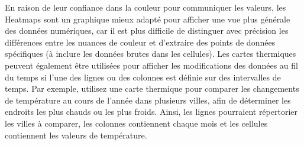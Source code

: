 \documentclass[french, a4paper, 12pt]{report}
\begin{document}
En raison de leur confiance dans la couleur pour communiquer les valeurs, les Heatmaps sont un graphique mieux adapté pour afficher une vue plus générale des données numériques, car il est plus difficile de distinguer avec précision les différences entre les nuances de couleur et d’extraire des points de données spécifiques (à inclure les données brutes dans les cellules).
Les cartes thermiques peuvent également être utilisées pour afficher les modifications des données au fil du temps si l'une des lignes ou des colonnes est définie sur des intervalles de temps. Par exemple, utilisez une carte thermique pour comparer les changements de température au cours de l’année dans plusieurs villes, afin de déterminer les endroits les plus chauds ou les plus froids. Ainsi, les lignes pourraient répertorier les villes à comparer, les colonnes contiennent chaque mois et les cellules contiennent les valeurs de température.
\end{document}
